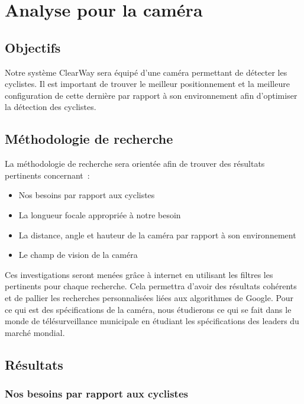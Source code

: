 
\section{Analyse pour la caméra}
\label{sec:camera}

\subsection{Objectifs}
\label{sec:camera_Objectifs}

Notre système ClearWay sera équipé d'une caméra permettant de détecter les cyclistes.
Il est important de trouver le meilleur positionnement et la meilleure configuration
de cette dernière par rapport à son environnement afin d'optimiser la détection des cyclistes.

\subsection{Méthodologie de recherche}
\label{sec:camera_Methodo}

La méthodologie de recherche sera orientée afin de trouver des résultats pertinents concernant :
\begin{itemize}
    \item Nos besoins par rapport aux cyclistes
    \item La longueur focale appropriée à notre besoin
    \item La distance, angle et hauteur de la caméra par rapport à son environnement
    \item Le champ de vision de la caméra
\end{itemize}
Ces investigations seront menées grâce à internet en utilisant les filtres les pertinents pour chaque recherche.
Cela permettra d'avoir des résultats cohérents et de pallier les recherches personnalisées liées aux algorithmes de Google.
Pour ce qui est des spécifications de la caméra, nous étudierons ce qui se fait dans
le monde de télésurveillance municipale en étudiant les spécifications des leaders du marché mondial.

\subsection{Résultats}
\label{sec:camera_resultats}

\subsubsection{Nos besoins par rapport aux cyclistes}
\label{sec:camera_cycliste}

